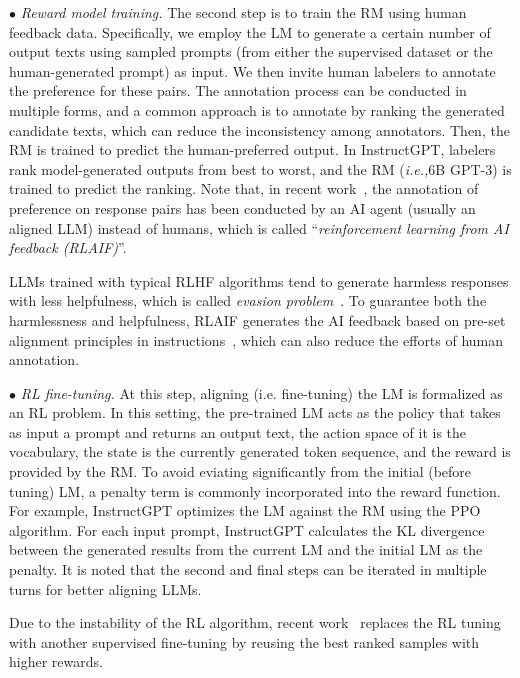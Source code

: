 $\bullet$ \textit{Reward model training.} The second step is to train the RM using human feedback data. Specifically, we employ the LM to generate a certain number of output texts using sampled prompts (from either the supervised dataset or the human-generated prompt) as input. We then invite human labelers to annotate the preference for these pairs. The annotation process can be conducted in multiple forms, and a common approach is to annotate by ranking the generated candidate texts, which can reduce  the inconsistency among annotators. Then,  the RM is trained to predict the human-preferred output. In InstructGPT, labelers rank model-generated outputs from best to worst, and the RM (\emph{i.e.,}6B GPT-3) is trained to predict the ranking. Note that, in recent work~\cite{Bai-arXiv-2022-Constitutional}, the annotation of preference on response pairs has been conducted by an AI agent (usually an aligned LLM) instead of humans, which is called ``\emph{reinforcement learning from AI feedback (RLAIF)}''. 

{LLMs trained with typical RLHF algorithms tend to generate harmless responses with less helpfulness, which is  called  \emph{evasion problem}~\cite{Bai-arXiv-2022-Constitutional}. To  guarantee both the harmlessness and helpfulness, RLAIF generates the AI feedback based on pre-set alignment principles in instructions~\cite{Bai-arXiv-2022-Constitutional,Lee-CoRR-2023-RLAIF}, which can also reduce  the efforts of human annotation.} 

$\bullet$ \textit{RL fine-tuning.} At this step, aligning (i.e. fine-tuning) the LM is formalized as an RL problem. In this setting, the pre-trained LM acts as the policy that takes as input a prompt and returns an output text, the action space of it is the vocabulary, the state is the currently generated token sequence, and the reward is provided by the RM. To avoid eviating significantly from the initial (before tuning) LM, a penalty term is commonly incorporated into the reward function. For example, InstructGPT optimizes the LM against the RM using the PPO algorithm. For each input prompt, InstructGPT calculates the KL divergence between the generated results from the current LM and the initial LM as the penalty. It is noted that the second and final steps can be iterated in multiple turns for better aligning LLMs. 

Due to the instability of the RL algorithm, recent work~\cite{Dong-RAFT-2023-arxiv} replaces the RL tuning with another supervised fine-tuning by reusing the best ranked samples with higher rewards.

